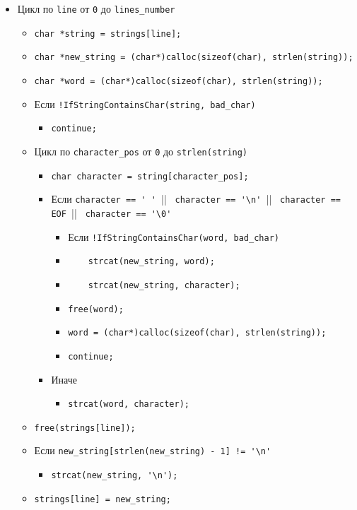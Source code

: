 \begin{itemize}
	\item Цикл по \verb|line| от \verb|0| до \verb|lines_number|
		\begin{itemize}
			\item \verb|char *string = strings[line];|
			\item \verb|char *new_string = (char*)calloc(sizeof(char), strlen(string));|
			\item \verb|char *word = (char*)calloc(sizeof(char), strlen(string));|
			\item Если \verb|!IfStringContainsChar(string, bad_char)|
				\begin{itemize}
					\item \verb|continue;|
				\end{itemize}
			\item Цикл по \verb|character_pos| от \verb|0| до \verb|strlen(string)|
				\begin{itemize}
					\item \verb|char character = string[character_pos];|
					\item Если \verb|character == ' ' |||
							   \verb| character == '\n' |||
							   \verb| character == EOF |||
							   \verb| character == '\0'|
						\begin{itemize}
							\item Если \verb|!IfStringContainsChar(word, bad_char)|
							\item \verb|    strcat(new_string, word);|
							\item \verb|    strcat(new_string, character);|
							\item \verb|free(word);|
							\item \verb|word = (char*)calloc(sizeof(char), strlen(string));|
							\item \verb|continue;|
						\end{itemize}
					\item Иначе
						\begin{itemize}
							\item \verb|strcat(word, character);|
						\end{itemize}
				\end{itemize}
			\item \verb|free(strings[line]);|
			\item Если \verb|new_string[strlen(new_string) - 1] != '\n'|
				\begin{itemize}
					\item \verb|strcat(new_string, '\n');|
				\end{itemize}
			\item \verb|strings[line] = new_string;|
		\end{itemize}
\end{itemize}

